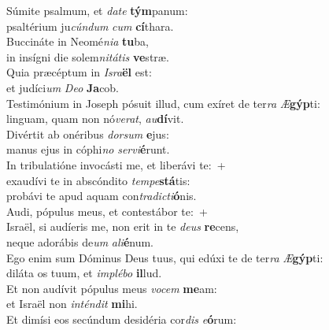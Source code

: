 \evenverse Súmite psalmum, et \textit{da}\textit{te} \textbf{tým}panum:~\*\\
\evenverse psaltérium ju\textit{cún}\textit{dum} \textit{cum} \textbf{cí}thara.\\
\oddverse Buccináte in Neomé\textit{ni}\textit{a} \textbf{tu}ba,~\*\\
\oddverse in insígni die solem\textit{ni}\textit{tá}\textit{tis} \textbf{ve}stræ.\\
\evenverse Quia præcéptum in \textit{Is}\textit{ra}\textbf{ël} est:~\*\\
\evenverse et judíci\textit{um} \textit{De}\textit{o} \textbf{Ja}cob.\\
\oddverse Testimónium in Joseph pósuit illud, cum exíret de ter\textit{ra} \textit{Æ}\textbf{gýp}ti:~\*\\
\oddverse linguam, quam non nó\textit{ve}\textit{rat}, \textit{au}\textbf{dí}vit.\\
\evenverse Divértit ab onéribus \textit{dor}\textit{sum} \textbf{e}jus:~\*\\
\evenverse manus ejus in cóphi\textit{no} \textit{ser}\textit{vi}\textbf{é}runt.\\
\oddverse In tribulatióne invocásti me, et liberávi te:~+\\
\oddverse  exaudívi te in abscóndito \textit{tem}\textit{pe}\textbf{stá}tis:~\*\\
\oddverse probávi te apud aquam con\textit{tra}\textit{di}\textit{cti}\textbf{ó}nis.\\
\evenverse Audi, pópulus meus, et contestábor te:~+\\
\evenverse  Israël, si audíeris me, non erit in te \textit{de}\textit{us} \textbf{re}cens,~\*\\
\evenverse neque adorábis de\textit{um} \textit{a}\textit{li}\textbf{é}num.\\
\oddverse Ego enim sum Dóminus Deus tuus, qui edúxi te de ter\textit{ra} \textit{Æ}\textbf{gýp}ti:~\*\\
\oddverse diláta os tuum, et \textit{im}\textit{plé}\textit{bo} \textbf{il}lud.\\
\evenverse Et non audívit pópulus meus \textit{vo}\textit{cem} \textbf{me}am:~\*\\
\evenverse et Israël non \textit{in}\textit{tén}\textit{dit} \textbf{mi}hi.\\
\oddverse Et dimísi eos secúndum desidéria cor\textit{dis} \textit{e}\textbf{ó}rum:~\*\\
